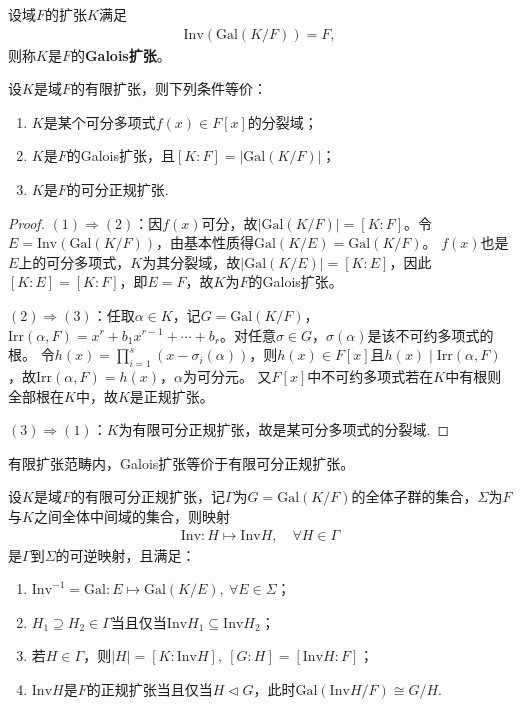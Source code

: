 \documentclass[../../main.tex]{subfiles}%
\begin{document}
\begin{definition}
设域$F$的扩张$K$满足
\begin{align*}
\mathrm{Inv}(\mathrm{Gal}(K/F))=F,
\end{align*}
则称$K$是$F$的\textbf{Galois扩张}。
\end{definition}

\begin{theorem}
设$K$是域$F$的有限扩张，则下列条件等价：
\begin{enumerate}[(1)]
\item $K$是某个可分多项式$f(x)\in F[x]$的分裂域；
\item $K$是$F$的Galois扩张，且$[K:F]=|\mathrm{Gal}(K/F)|$；
\item $K$是$F$的可分正规扩张.
\end{enumerate}
\end{theorem}

\begin{proof}

$(1)\Rightarrow(2)$：因$f(x)$可分，故$|\mathrm{Gal}(K/F)|=[K:F]$。令$E=\mathrm{Inv}(\mathrm{Gal}(K/F))$，由基本性质得$\mathrm{Gal}(K/E)=\mathrm{Gal}(K/F)$。
$f(x)$也是$E$上的可分多项式，$K$为其分裂域，故$|\mathrm{Gal}(K/E)|=[K:E]$，因此$[K:E]=[K:F]$，即$E=F$，故$K$为$F$的Galois扩张。

$(2)\Rightarrow(3)$：任取$\alpha\in K$，记$G=\mathrm{Gal}(K/F)$，$\mathrm{Irr}(\alpha,F)=x^r+b_1x^{r-1}+\cdots+b_r$。对任意$\sigma\in G$，$\sigma(\alpha)$是该不可约多项式的根。
令$h(x)=\prod\limits_{i=1}^s(x-\sigma_i(\alpha))$，则$h(x)\in F[x]$且$h(x)\mid\mathrm{Irr}(\alpha,F)$，故$\mathrm{Irr}(\alpha,F)=h(x)$，$\alpha$为可分元。
又$F[x]$中不可约多项式若在$K$中有根则全部根在$K$中，故$K$是正规扩张。

$(3)\Rightarrow(1)$：$K$为有限可分正规扩张，故是某可分多项式的分裂域.

\end{proof}

\begin{remark}
有限扩张范畴内，Galois扩张等价于有限可分正规扩张。
\end{remark}

\begin{theorem}
设$K$是域$F$的有限可分正规扩张，记$\Gamma$为$G=\mathrm{Gal}(K/F)$的全体子群的集合，$\Sigma$为$F$与$K$之间全体中间域的集合，则映射
\begin{align*}
\mathrm{Inv}:H\mapsto\mathrm{Inv}H,\quad \forall H\in\Gamma
\end{align*}
是$\Gamma$到$\Sigma$的可逆映射，且满足：
\begin{enumerate}[(1)]
\item $\mathrm{Inv}^{-1}=\mathrm{Gal}:E\mapsto\mathrm{Gal}(K/E),\ \forall E\in\Sigma$；
\item $H_1\supseteq H_2\in\Gamma$当且仅当$\mathrm{Inv}H_1\subseteq\mathrm{Inv}H_2$；
\item 若$H\in\Gamma$，则$|H|=[K:\mathrm{Inv}H],\ [G:H]=[\mathrm{Inv}H:F]$；
\item $\mathrm{Inv}H$是$F$的正规扩张当且仅当$H\lhd G$，此时$\mathrm{Gal}(\mathrm{Inv}H/F)\cong G/H$.
\end{enumerate}
\end{theorem}
\end{document}
